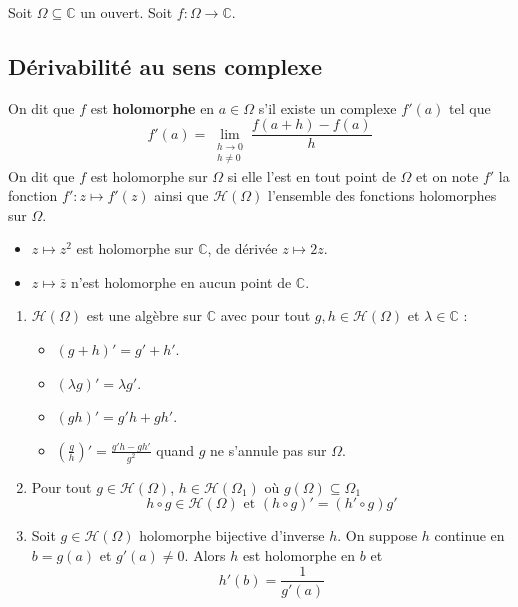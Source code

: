 




  Soit $\Omega \subseteq \mathbb{C}$ un ouvert. Soit $f : \Omega \rightarrow \mathbb{C}$.

  \subsection{Dérivabilité au sens complexe}


  \begin{definition}
    On dit que $f$ est \textbf{holomorphe} en $a \in \Omega$ s'il existe un complexe $f'(a)$ tel que
    \[ f'(a) = \lim_{\substack{h \rightarrow 0 \\ h \neq 0}} \frac{f(a+h) - f(a)}{h} \]
    On dit que $f$ est holomorphe sur $\Omega$ si elle l'est en tout point de $\Omega$ et on note $f'$ la fonction $f' : z \mapsto f'(z)$ ainsi que $\mathcal{H}(\Omega)$ l'ensemble des fonctions holomorphes sur $\Omega$.
  \end{definition}

  \begin{example}
    \begin{itemize}
      \item $z \mapsto z^2$ est holomorphe sur $\mathbb{C}$, de dérivée $z \mapsto 2z$.
      \item $z \mapsto \overline{z}$ n'est holomorphe en aucun point de $\mathbb{C}$.
    \end{itemize}
  \end{example}

  \begin{proposition}
    \begin{enumerate}[label=(\roman*)]
      \item $\mathcal{H}(\Omega)$ est une algèbre sur $\mathbb{C}$ avec pour tout $g, h \in \mathcal{H}(\Omega)$ et $\lambda \in \mathbb{C}$ :
      \begin{itemize}
        \item $(g+h)' = g'+h'$.
        \item $(\lambda g)' = \lambda g'$.
        \item $(gh)' = g'h + gh'$.
        \item $\left( \frac{g}{h} \right)' = \frac{g'h - gh'}{g^2}$ quand $g$ ne s'annule pas sur $\Omega$.
      \end{itemize}
      \item Pour tout $g \in \mathcal{H}(\Omega)$, $h \in \mathcal{H}(\Omega_1)$ où $g(\Omega) \subseteq \Omega_1$
      \[ h \circ g \in \mathcal{H}(\Omega) \text{ et } (h \circ g)' = (h' \circ g) g' \]
      \item Soit $g \in \mathcal{H}(\Omega)$ holomorphe bijective d'inverse $h$. On suppose $h$ continue en $b = g(a)$ et $g'(a) \neq 0$. Alors $h$ est holomorphe en $b$ et
      \[ h'(b) = \frac{1}{g'(a)} \]
    \end{enumerate}
  \end{proposition}

